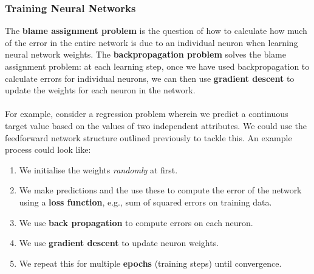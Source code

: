 \documentclass[a4paper,11pt]{article}
\begin{document}
\subsubsection{Training Neural Networks}
The \textbf{blame assignment problem} is the question of how to calculate how much of the error in the entire network is due to an individual neuron when learning neural network weights.
The \textbf{backpropagation problem} solves the blame assignment problem:
at each learning step, once we have used backpropagation to calculate errors for individual neurons, we can then use \textbf{gradient descent} to update the weights for each neuron in the network.
\\\\
For example, consider a regression problem wherein we predict a continuous target value based on the values of two independent attributes.
We could use the feedforward network structure outlined previously to tackle this. 
An example process could look like:
\begin{enumerate}
    \item   We initialise the weights \textit{randomly} at first.
    \item   We make predictions and the use these to compute the error of the network using a \textbf{loss function}, e.g., sum of squared errors on training data.
    \item   We use \textbf{back propagation} to compute errors on each neuron.
    \item   We use \textbf{gradient descent} to update neuron weights.
    \item   We repeat this for multiple \textbf{epochs} (training steps) until convergence.
\end{enumerate}
\end{document}
